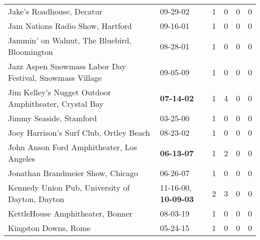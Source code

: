\begin{longtable}{p{}p{}p{}p{}p{}p{}}
                                                    Jake's Roadhouse, Decatur &                                                09-29-02\textsuperscript{} &  1 &  0 &  0 &  0 \\
                                             Jam Nations Radio Show, Hartford &                                                09-16-01\textsuperscript{} &  1 &  0 &  0 &  0 \\
                                 Jammin' on Walnut, The Bluebird, Bloomington &                                                08-28-01\textsuperscript{} &  1 &  0 &  0 &  0 \\
                     Jazz Aspen Snowmass Labor Day Festival, Snowmass Village &                                                09-05-09\textsuperscript{} &  1 &  0 &  0 &  0 \\
                        Jim Kelley's Nugget Outdoor Amphitheater, Crystal Bay &                                       \textbf{07-14-02\textsuperscript{}} &  1 &  4 &  0 &  0 \\
                                                      Jimmy Seaside, Stamford &                                                03-25-00\textsuperscript{} &  1 &  0 &  0 &  0 \\
                                      Joey Harrison's Surf Club, Ortley Beach &                                                08-23-02\textsuperscript{} &  1 &  0 &  0 &  0 \\
                                    John Anson Ford Amphitheater, Los Angeles &                                       \textbf{06-13-07\textsuperscript{}} &  1 &  2 &  0 &  0 \\
                                            Jonathan Brandmeier Show, Chicago &                                                06-26-07\textsuperscript{} &  1 &  0 &  0 &  0 \\
                              Kennedy Union Pub, University of Dayton, Dayton &           11-16-00\textsuperscript{}, \textbf{10-09-03\textsuperscript{}} &  2 &  3 &  0 &  0 \\
                                             KettleHouse Amphitheater, Bonner &                                                08-03-19\textsuperscript{} &  1 &  0 &  0 &  0 \\
                                                         Kingston Downs, Rome &                                                05-24-15\textsuperscript{} &  1 &  0 &  0 &  0 \\

\end{longtable}
